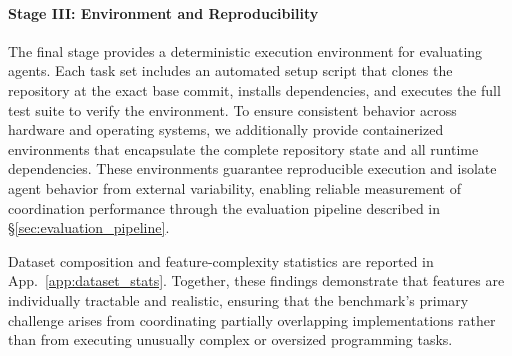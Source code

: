 \paragraph{Stage III: Environment and Reproducibility}

The final stage provides a deterministic execution environment for evaluating agents. 
Each task set includes an automated setup script that clones the repository at the exact base commit, installs dependencies, and executes the full test suite to verify the environment. 
To ensure consistent behavior across hardware and operating systems, we additionally provide containerized environments that encapsulate the complete repository state and all runtime dependencies. 
These environments guarantee reproducible execution and isolate agent behavior from external variability, enabling reliable measurement of coordination performance through the evaluation pipeline described in \S\ref{sec:evaluation_pipeline}. 

Dataset composition and feature-complexity statistics are reported in App.~\ref{app:dataset_stats}. 
Together, these findings demonstrate that \dataset features are individually tractable and realistic, ensuring that the benchmark's primary challenge arises from coordinating partially overlapping implementations rather than from executing unusually complex or oversized programming tasks.
